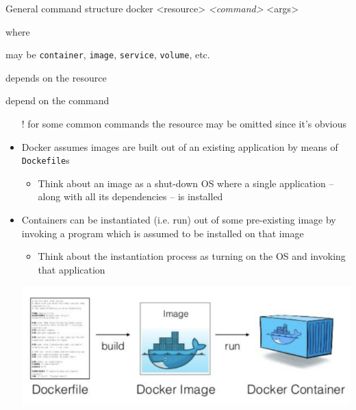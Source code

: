 \documentclass[presentation]{beamer}\mode<presentation>{\usetheme{AMSBolognaFC}}
\begin{document}
\begin{frame}[allowframebreaks]
\begin{block}{General command structure}
        docker \alert{<resource>} \textit{<command>} <args>
    \end{block}
    where
    \begin{description}\small
        \item[\texttt{resource}] may be \texttt{container}, \texttt{image}, \texttt{service}, \texttt{volume}, etc.
        \item[\texttt{command}] depends on the resource
        \item[\texttt{args}] depend on the command
    \end{description}
    \begin{itemize}\small
        \item[!] for some common commands the resource may be omitted since it's obvious
    \end{itemize}

    \framebreak

    \begin{itemize}

        \item Docker assumes images are \alert{built} out of an existing application by means of \alert{\texttt{Dockefile}s}

        \begin{itemize}
            \item Think about an image as a shut-down OS where a single application -- along with all its dependencies -- is installed
        \end{itemize}

        \smallskip

        \item Containers can be instantiated (i.e. \alert{run}) out of some pre-existing image by invoking a program which is assumed to be installed on that image

        \begin{itemize}
            \item Think about the instantiation process as turning on the OS and invoking that application
        \end{itemize}

        \smallskip

        \begin{center}
            \includegraphics[width=.5\linewidth]{img/build-run-workflow.png}
        \end{center}


\end{itemize}
\end{frame}
\end{document}
